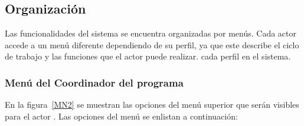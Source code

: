 \subsection{Organización}
Las funcionalidades del sistema se encuentra organizadas por menús. Cada actor accede a un menú diferente dependiendo de su perfil, ya que este describe el ciclo de trabajo y las funciones que el actor puede realizar.
cada perfil en el sistema.

\subsubsection{Menú del Coordinador del programa}

    En la figura~\ref{MN2} se muestran las opciones del menú superior que serán visibles para el actor . Las opciones del menú se enlistan a continuación:
